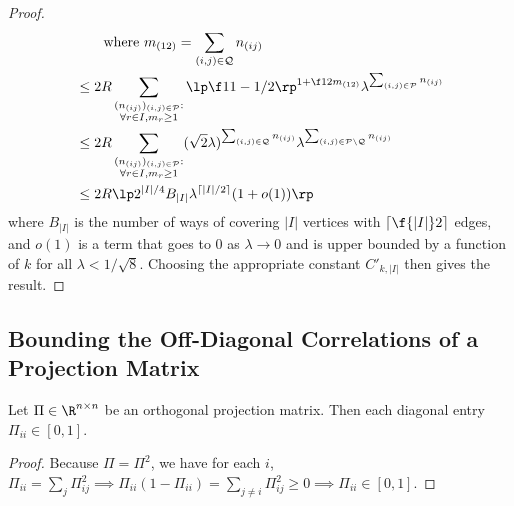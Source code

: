 \documentclass[main.tex]{subfiles}
\begin{document}
\begin{proof}
\begin{align*}
    &\qquad {\text{where $m_{(12)} = \sum_{(i,j) \in \mathcal Q} n_{(ij)}$}}
        \\
    &\le
        2R
        \sum_{\substack{(n_{(ij)})_{(i,j) \in \mathcal P}:\\\forall r \in I, m_r \ge 1}}
        \lp \f 1 {1 - 1/2} \rp^{1 + \f 1 2 m_{(12)}}
         \lambda^{\sum_{(i,j) \in \mathcal P} n_{(ij)}}
        \\
    &\le
        2R
        \sum_{\substack{(n_{(ij)})_{(i,j) \in \mathcal P}:\\\forall r \in I, m_r \ge 1}}
         (\sqrt 2 \lambda)^{\sum_{(i,j) \in \mathcal Q} n_{(ij)}}
         \lambda^{\sum_{(i,j)\in \mathcal P \setminus \mathcal Q} n_{(ij)}}
        \\
    &\le
        2R
        \lp 2^{|I|/4} B_{|I|} \lambda^{\lceil |I|/2\rceil} (1 + o(1)) \rp
\end{align*}
where $B_{|I|}$ is the number of ways of covering $|I|$ vertices with $\lceil \f{|I|}2 \rceil$ edges, and
$o(1)$ is a term that goes to 0 as $\lambda \to 0$ and is upper bounded by a function of $k$ for all $\lambda < 1/\sqrt 8$.
Choosing the appropriate constant $C'_{k, |I|}$ then gives the result.
\end{proof}

\subsection{Bounding the Off-Diagonal Correlations of a Projection Matrix}

\begin{lemma}\label{lemma:projectionDiagonal}
Let $\Pi \in \R^{n \times n}$ be an orthogonal projection matrix.
Then each diagonal entry $\Pi_{ii} \in [0, 1].$
\end{lemma}
\begin{proof}
Because $\Pi = \Pi^2$, we have for each $i$, $\Pi_{ii} = \sum_{j} \Pi_{ij}^2 \implies \Pi_{ii} (1 - \Pi_{ii}) = \sum_{j \ne i} \Pi_{ij}^2 \ge 0 \implies \Pi_{ii} \in [0, 1].$
\end{proof}
\end{document}
